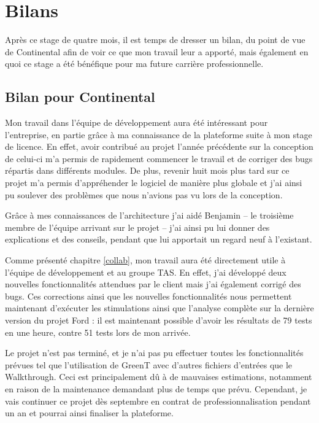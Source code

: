 \chapter{Bilans}
\putminitoc

Après ce stage de quatre mois, il est temps de dresser un bilan, du point de vue de Continental afin de voir ce que mon travail leur a apporté, mais également en quoi ce stage a été bénéfique pour ma future carrière professionnelle.

\section{Bilan pour Continental}
Mon travail dans l'équipe de développement aura été intéressant pour l'entreprise, en partie grâce à ma connaissance de la plateforme suite à mon stage de licence. En effet, avoir contribué au projet l'année précédente sur la conception de celui-ci m'a permis de rapidement commencer le travail et de corriger des bugs répartis dans différents modules. De plus, revenir huit mois plus tard sur ce projet m'a permis d'appréhender le logiciel de manière plus globale et j'ai ainsi pu soulever des problèmes que nous n'avions pas vu lors de la conception.

Grâce à mes connaissances de l'architecture j'ai aidé Benjamin  -- le troisième membre de l'équipe arrivant sur le projet -- j'ai ainsi pu lui donner des explications et des conseils, pendant que lui apportait un regard neuf à l'existant.

Comme présenté chapitre \ref{collab}, mon travail aura été directement utile à l'équipe de développement et au groupe TAS. En effet, j'ai développé deux nouvelles fonctionnalités attendues par le client mais j'ai également corrigé des bugs. Ces corrections ainsi que les nouvelles fonctionnalités nous permettent maintenant d'exécuter les stimulations ainsi que l'analyse complète sur la dernière version du projet Ford : il est maintenant possible d'avoir les résultats de 79 tests en une heure, contre 51 tests lors de mon arrivée.

Le projet n'est pas terminé, et je n'ai pas pu effectuer toutes les fonctionnalités prévues tel que l'utilisation de GreenT avec d'autres fichiers d'entrées que le Walkthrough. Ceci est principalement dû à de mauvaises estimations, notamment en raison de la maintenance demandant plus de temps que prévu. Cependant, je vais continuer ce projet dès septembre en contrat de professionnalisation pendant un an et pourrai ainsi finaliser la plateforme.

